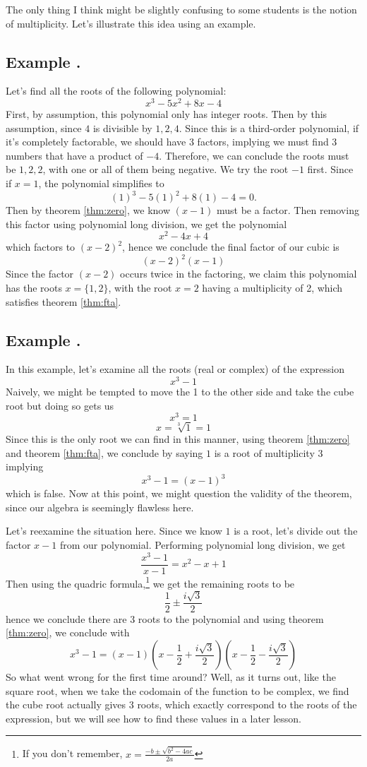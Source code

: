 \documentclass[11pt]{article}
\numberwithin{lemma}{section}
\numberwithin{equation}{section}
\numberwithin{define}{section}
\numberwithin{prop}{section}
\numberwithin{figure}{section}
\numberwithin{theorem}{section}
\numberwithin{cor}{section}
\newcounter{ex}[section]
\newenvironment{ex}[0]{

	\refstepcounter{ex}
    \subsection*{Example \theex .}
    }
    {
    \par
    }
\numberwithin{ex}{section}
\def\paren#1{\left(#1\right)}
\begin{document}
The only thing I think might be slightly confusing to some students is the notion of multiplicity. Let's illustrate this idea using an example.
\begin{ex}
Let's find all the roots of the following polynomial:
$$x^3-5 x^2+8 x-4$$
First, by assumption, this polynomial only has integer roots. Then by this assumption, since $4$ is divisible by $1,2,4$. Since this is a third-order polynomial, if it's completely factorable, we should have 3 factors, implying we must find 3 numbers that have a product of $-4$. Therefore, we can conclude the roots must be $1,2,2$, with one or all of them being negative. We try the root $-1$ first. Since if $x=1$, the polynomial simplifies to
$$(1)^3-5(1)^2+8(1)-4=0.$$
Then by theorem \eqref{thm:zero}, we know $(x-1)$ must be a factor. Then removing this factor using polynomial long division, we get the polynomial
$$x^2-4x+4$$
which factors to $(x-2)^2$, hence we conclude the final factor of our cubic is
$$(x-2)^2(x-1)$$
Since the factor $(x-2)$ occurs twice in the factoring, we claim this polynomial has the roots $x=\{1,2\}$, with the root $x=2$ having a multiplicity of 2, which satisfies theorem \eqref{thm:fta}.
\end{ex}

\begin{ex}
	In this example, let's examine all the roots (real or complex) of the expression
	$$x^3-1$$
	Naively, we might be tempted to move the 1 to the other side and take the cube root but doing so gets us
	$$x^3=1$$
	$$x=\sqrt[3]{1}=1$$
	Since this is the only root we can find in this manner, using theorem \eqref{thm:zero} and theorem \eqref{thm:fta},
we conclude by saying $1$ is a root of multiplicity 3 implying 
$$x^3-1=(x-1)^3$$
which is false. Now at this point, we might question the validity of the theorem, since our algebra is seemingly flawless here.

Let's reexamine the situation here. Since we know $1$ is a root, let's divide out the factor $x-1$ from our polynomial. Performing polynomial long division, we get
$$\frac{x^3-1}{x-1}=x^2-x+1$$
Then using the quadric formula,\footnote{
If you don't remember, $x=\frac{-b\pm\sqrt{b^2-4ac}}{2a}$}
we get the remaining roots to be
$$\frac{1}{2}\pm \frac{i\sqrt{3}}{2}$$
hence we conclude there are 3 roots to the polynomial and using theorem \eqref{thm:zero}, we conclude with
$$x^3-1=(x-1)\paren{x-\frac{1}{2}+\frac{i\sqrt{3}}{2}}\paren{x-\frac{1}{2}-\frac{i\sqrt{3}}{2}}$$
So what went wrong for the first time around? Well, as it turns out, like the square root, when we take the codomain of the function to be complex, we find the cube root actually gives 3 roots, which exactly correspond to the roots of the expression, but we will see how to find these values in a later lesson. 
\end{ex}
\end{document}
